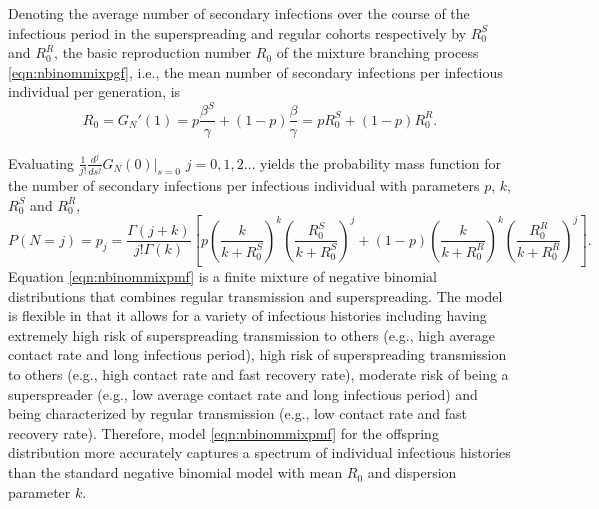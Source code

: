 \documentclass{imammb}
\numberwithin{equation}{section}
\begin{document}
Denoting the average number of secondary infections over the course of the infectious period in the superspreading and regular cohorts respectively by $R_0^S$ and $R_0^R$, the basic reproduction number $R_0$ of the mixture branching process \eqref{eqn:nbinommixpgf}, i.e., the mean number of secondary infections per infectious individual per generation, is  
\begin{equation}\label{eqn:R0}
   R_0= G_N'(1) = p\frac{ \beta^S }{\gamma } +(1-p)\frac{ \beta }  {\gamma  } = p R_0^S + (1-p) R_0^R.%
\end{equation}

Evaluating $\frac{1}{j!} \frac{d^j}{ds^j} G_N(0) |_{s=0}$ $j=0,1,2\dots$ yields the probability mass function for the number of secondary infections per infectious individual with parameters $p$, $k$, $R_0^S$ and $R_0^R$,
\begin{equation}\label{eqn:nbinommixpmf}
    P(N=j) = p_j = \frac{\Gamma(j+k)}{j! \Gamma (k)} \left [ p \left(\frac{k}{k+R_0^S} \right)^{k}\left (\frac{R_0^S}{k+R_0^S} \right )^j+ (1-p) \left(\frac{k}{k+R_0^R} \right)^{k}\left (\frac{R_0^R}{k+R_0^R} \right )^j \right ].
\end{equation}
Equation \eqref{eqn:nbinommixpmf} is a finite mixture of negative binomial distributions that combines regular transmission and superspreading. %
The model is flexible in that it allows for a variety of infectious histories including having extremely high risk of superspreading transmission to others (e.g., high average contact rate and long infectious period), high risk of superspreading transmission to others (e.g., high contact rate and fast recovery rate), moderate risk of being a superspreader (e.g., low average contact rate and long infectious period) and being characterized by regular transmission (e.g., low contact rate and fast recovery rate). Therefore, model \eqref{eqn:nbinommixpmf} for the offspring distribution more accurately captures a spectrum of individual infectious histories than the standard negative binomial model with mean $R_0$ and dispersion parameter $k$. 
\end{document}
